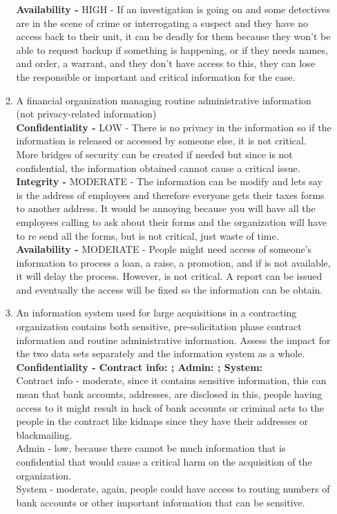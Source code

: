 \documentclass[12pt]{article}
\begin{document}
\begin{enumerate}
\begin{enumerate}
		\textbf{Availability - } HIGH - If an investigation is going on and some detectives are in the scene of crime or interrogating a suspect and they have no access back to their unit, it can be deadly for them because they won't be able to request backup if something is happening, or if they needs names, and order, a warrant, and they don't have access to this, they can lose the responsible or important and critical information for the case. \\

		
		\item{A financial organization managing routine administrative information (not privacy-related information)} \\

		\textbf{Confidentiality - } LOW - There is no privacy in the information so if the information is released or accessed by someone else, it is not critical. More bridges of security can be created if needed but since is not confidential, the information obtained cannot cause a critical issue. \\
		
		\textbf{Integrity - } MODERATE - The information can be modify and lets say is the address of employees and therefore everyone gets their taxes forms to another address. It would be annoying because you will have all the employees calling to ask about their forms and the organization will have to re send all the forms, but is not critical, just waste of time. \\
		
		\textbf{Availability - } MODERATE - People might need access of someone's information to process a loan, a raise, a promotion, and if is not available, it will delay the process. However, is not critical. A report can be issued and eventually the access will be fixed so the information can be obtain.  \\

		
		\item{An information system used for large acquisitions in a contracting organization contains both sensitive, pre-solicitation phase contract information and routine administrative information. Assess the impact for the two data sets separately and the information system as a whole.} \\

		\textbf{Confidentiality - Contract info: ; Admin: ; System: } \\Contract info - moderate, since it contains sensitive information, this can mean that bank accounts, addresses, are disclosed in this, people having access to it might result in hack of bank accounts or criminal acts to the people in the contract like kidnaps since they have their addresses or blackmailing. \\ Admin - low, because there cannot be much information that is confidential that would cause a critical harm on the acquisition of the organization.\\ System - moderate, again, people could have access to routing numbers of bank accounts or other important information that can be sensitive. \\
		

\end{enumerate}
\end{enumerate}
\end{document}

